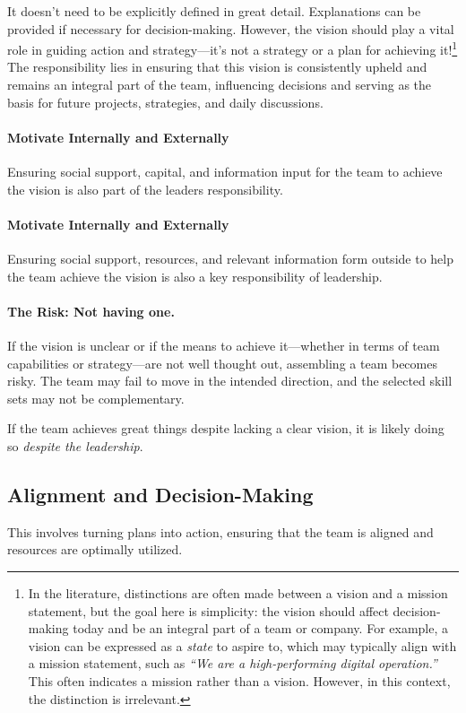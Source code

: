 It doesn’t need to be explicitly defined in great detail. Explanations can be provided if necessary for decision-making. However, the vision should play a vital role in guiding action and strategy—it’s not a strategy or a plan for achieving it!\footnote{
	In the literature, distinctions are often made between a vision and a mission statement, but the goal here is simplicity: the vision should affect decision-making today and be an integral part of a team or company. For example, a vision can be expressed as a \textit{state} to aspire to, which may typically align with a mission statement, such as \textit{“We are a high-performing digital operation.”} This often indicates a mission rather than a vision. However, in this context, the distinction is irrelevant.
}\\

The responsibility lies in ensuring that this vision is consistently upheld and remains an integral part of the team, influencing decisions and serving as the basis for future projects, strategies, and daily discussions.

\paragraph{Motivate Internally and Externally}
Ensuring social support, capital, and information input for the team to achieve the vision is also part of the leaders responsibility.

\paragraph{Motivate Internally and Externally}
Ensuring social support, resources, and relevant information form outside to help the team achieve the vision is also a key responsibility of leadership.

\paragraph{The Risk: Not having one.}
If the vision is unclear or if the means to achieve it—whether in terms of team capabilities or strategy—are not well thought out, assembling a team becomes risky. The team may fail to move in the intended direction, and the selected skill sets may not be complementary.

If the team achieves great things despite lacking a clear vision, it is likely doing so \textit{despite the leadership}.

\subsection{Alignment and Decision-Making} \label{responsibility__alignment}
This involves turning plans into action, ensuring that the team is aligned and resources are optimally utilized.

